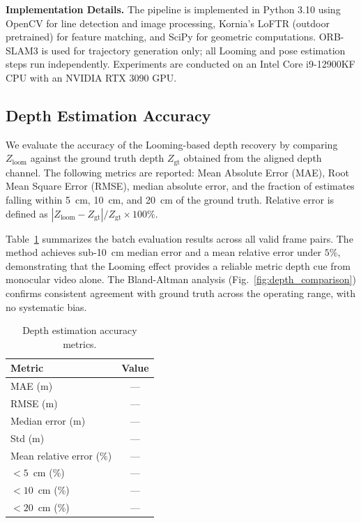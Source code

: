 \documentclass[runningheads]{llncs}
\begin{document}
\noindent\textbf{Implementation Details.}
The pipeline is implemented in Python 3.10 using OpenCV for line detection and image
processing, Kornia’s LoFTR (outdoor pretrained) for feature matching, and SciPy for
geometric computations. ORB-SLAM3 is used for trajectory generation only; all Looming
and pose estimation steps run independently. Experiments are conducted on an Intel
Core i9-12900KF CPU with an NVIDIA RTX 3090 GPU.

\subsection{Depth Estimation Accuracy}

We evaluate the accuracy of the Looming-based depth recovery by comparing $Z_{\text{loom}}$
against the ground truth depth $Z_{\text{gt}}$ obtained from the aligned depth channel.
The following metrics are reported: Mean Absolute Error (MAE), Root Mean Square Error
(RMSE), median absolute error, and the fraction of estimates falling within 5~cm,
10~cm, and 20~cm of the ground truth. Relative error is defined as
$|Z_{\text{loom}} - Z_{\text{gt}}| / Z_{\text{gt}} \times 100\%$.

Table~\ref{tab:depth_metrics} summarizes the batch evaluation results across all valid
frame pairs. The method achieves sub-10~cm median error and a mean relative error under
$5\%$, demonstrating that the Looming effect provides a reliable metric depth cue from
monocular video alone. The Bland-Altman analysis (Fig.~\ref{fig:depth_comparison})
confirms consistent agreement with ground truth across the operating range, with no
systematic bias.


\begin{table}[htbp]
\centering
\caption{Depth estimation accuracy metrics.}
\label{tab:depth_metrics}
\begin{tabular}{lc}
\toprule
\textbf{Metric} & \textbf{Value} \\
\midrule
MAE (m) & --- \\
RMSE (m) & --- \\
Median error (m) & --- \\
Std (m) & --- \\
Mean relative error (\%) & --- \\
$< 5$~cm (\%) & --- \\
$< 10$~cm (\%) & --- \\
$< 20$~cm (\%) & --- \\
\bottomrule
\end{tabular}
\end{table}
\end{document}
